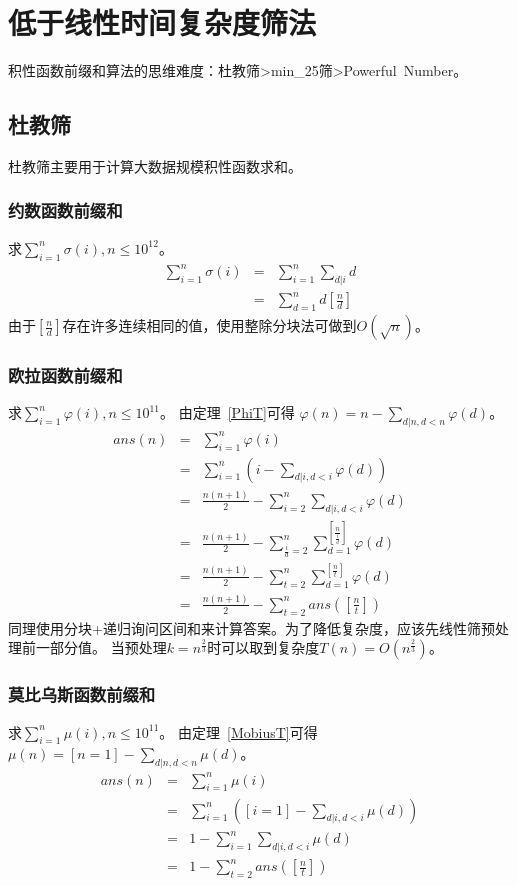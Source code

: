 \section{低于线性时间复杂度筛法}
积性函数前缀和算法的思维难度：杜教筛>min\_25筛>Powerful~Number。
\subsection{杜教筛}
杜教筛主要用于计算大数据规模积性函数求和。
\subsubsection{约数函数前缀和}
求$\displaystyle \sum_{i=1}^n{\sigma(i)},n\leq 10^{12}$。
\begin{eqnarray*}
    \sum_{i=1}^n{\sigma(i)}&=&\sum_{i=1}^n{\sum_{d|i}d}\\
    &=&\sum_{d=1}^n{d[\frac{n}{d}]}
\end{eqnarray*}
由于$[\frac{n}{d}]$存在许多连续相同的值，使用整除分块法可做到$O(\sqrt{n})$。
\subsubsection{欧拉函数前缀和}
求$\displaystyle \sum_{i=1}^n{\varphi(i)},n\leq 10^{11}$。
由定理~\ref{PhiT}可得
$\displaystyle \varphi(n)=n-\sum_{d|n,d<n}{\varphi(d)}$。
\begin{eqnarray*}
    ans(n)&=&\sum_{i=1}^n{\varphi(i)}\\
    &=&\sum_{i=1}^n{\left(i-\sum_{d|i,d<i}{\varphi(d)}\right)}\\
    &=&\frac{n(n+1)}{2}-\sum_{i=2}^{n}{\sum_{d|i,d<i}{\varphi(d)}}\\
    &=&\frac{n(n+1)}{2}-\sum_{\frac{i}{d}=2}^n
    {\sum_{d=1}^{[\frac{n}{\frac{i}{d}}]}{\varphi(d)}}\\
    &=&\frac{n(n+1)}{2}-\sum_{t=2}^n
    {\sum_{d=1}^{[\frac{n}{t}]}{\varphi(d)}}\\
    &=&\frac{n(n+1)}{2}-\sum_{t=2}^n{ans([\frac{n}{t}])}
\end{eqnarray*}
同理使用分块+递归询问区间和来计算答案。为了降低复杂度，应该先线性筛预处理前一部分值。
当预处理$k=n^\frac{2}{3}$时可以取到复杂度$T(n)=O(n^\frac{2}{3})$。
\subsubsection{莫比乌斯函数前缀和}
求$\displaystyle \sum_{i=1}^n{\mu(i)},n\leq 10^{11}$。
由定理~\ref{MobiusT}可得
$\displaystyle \mu(n)=[n=1]-\sum_{d|n,d<n}{\mu(d)}$。
\begin{eqnarray*}
    ans(n)&=&\sum_{i=1}^n{\mu(i)}\\
    &=&\sum_{i=1}^n{\left([i=1]-\sum_{d|i,d<i}{\mu(d)}\right)}\\
    &=&1-\sum_{i=1}^n{\sum_{d|i,d<i}{\mu(d)}}\\
    &=&1-\sum_{t=2}^n{ans([\frac{n}{t}])}
\end{eqnarray*}

